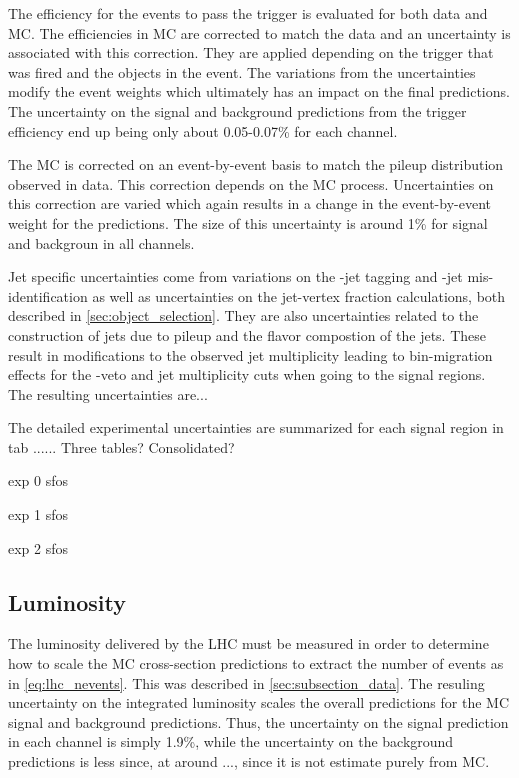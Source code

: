 The efficiency for the events to pass the trigger is evaluated for both 
data and MC.  The efficiencies in MC are corrected to match the data
and an uncertainty is associated with this correction.  They are applied
depending on the trigger that was fired and the objects in the event.
The variations from the uncertainties
modify the event weights which ultimately has an impact on the final predictions.
The uncertainty on the signal and background predictions from the trigger
efficiency end up being only about 0.05-0.07\%  for each channel.

The MC is corrected on an event-by-event basis to match the 
pileup distribution observed in data. This correction depends on the 
MC process. Uncertainties on this correction are varied which again
results in a change in the event-by-event weight for the predictions. The
size of this uncertainty is around 1\% for signal and backgroun in all channels.


Jet specific uncertainties come from variations on the \bee-jet tagging
and \bee-jet mis-identification as well as uncertainties on the jet-vertex
fraction calculations, both described in \sec\ref{sec:object_selection}. They
are also uncertainties related to the construction of jets due to pileup
and the flavor compostion of the jets. These result in modifications
to the observed jet multiplicity leading to bin-migration effects 
for the \bee-veto and jet multiplicity cuts when going to the signal regions.
The resulting uncertainties are...

The detailed experimental uncertainties are summarized for each signal 
region in tab ...... Three tables? Consolidated?

\begin{table}[ht]
\centering

\caption{exp 0 sfos}
\label{tab:sys_exp_0sfos}
\end{table}

\begin{table}[ht]
\centering

\caption{exp 1 sfos}
\label{tab:sys_exp_1sfos}
\end{table}

\begin{table}[ht]
\centering

\caption{exp 2 sfos}
\label{tab:sys_exp_2sfos}
\end{table}
\subsection{Luminosity}
The luminosity delivered by the LHC must be measured in order to determine
how to scale the MC cross-section
predictions to extract the number of events as in \eqn\eqref{eq:lhc_nevents}.
This was described in \sec\ref{sec:subsection_data}. The resuling
uncertainty on the integrated luminosity scales the overall predictions
for the MC signal and background predictions. Thus, the uncertainty 
on the signal prediction in each channel is simply 1.9\%, while the uncertainty
on the background predictions is less since, at around ...,
since it is not estimate purely from MC.





